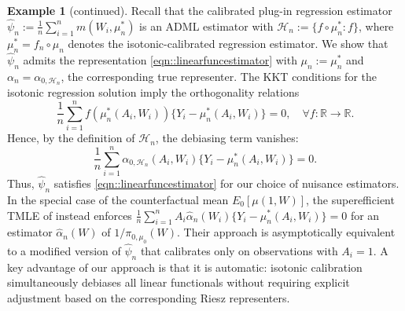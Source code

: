 \documentclass[11pt]{article}
\theoremstyle{definition}
\newtheorem{example}{Example}
\begin{document}
\begin{example}[continued]
Recall that the calibrated plug-in regression estimator \(\widehat{\psi}_n := \frac{1}{n} \sum_{i=1}^n m(W_i,\mu_n^*)\) is an ADML estimator with \(\mathcal{H}_n := \{f \circ \mu_n^* : f\}\), where \(\mu_n^* = f_n \circ \mu_n\) denotes the isotonic-calibrated regression estimator. We show that \(\widehat{\psi}_n\) admits the representation \eqref{eqn::linearfuncestimator} with $\mu_n := \mu_n^*$ and \(\alpha_n = \alpha_{0,\mathcal{H}_n}\), the corresponding true representer. The KKT conditions for the isotonic regression solution imply the orthogonality relations \citep{van2024automatic}
\begin{equation*}
\frac{1}{n} \sum_{i=1}^n f(\mu_n^*(A_i,W_i))\{Y_i - \mu_n^*(A_i,W_i)\} = 0, \quad \forall f:\mathbb{R}\to\mathbb{R}.
\end{equation*}
Hence, by the definition of \(\mathcal{H}_n\), the debiasing term vanishes:
\[
\frac{1}{n}\sum_{i=1}^n \alpha_{0,\mathcal{H}_n}(A_i,W_i)\{Y_i - \mu_n^*(A_i,W_i)\} = 0.
\]
Thus, \(\widehat{\psi}_n\) satisfies \eqref{eqn::linearfuncestimator} for our choice of nuisance estimators. In the special case of the counterfactual mean \(E_0[\mu(1,W)]\), the superefficient TMLE of \citet{ATEsupereff} instead enforces $\frac{1}{n}\sum_{i=1}^n A_i \widehat{\alpha}_n(W_i)\{Y_i - \mu_n^*(A_i,W_i)\} = 0 $ for an estimator \(\widehat{\alpha}_n(W)\) of $1/\pi_{0,\mu_0}(W)$. Their approach is asymptotically equivalent to a modified version of \(\widehat{\psi}_n\) that calibrates only on observations with \(A_i=1\). A key advantage of our approach is that it is automatic: isotonic calibration simultaneously debiases all linear functionals without requiring explicit adjustment based on the corresponding Riesz representers.
 
\end{example}



 
  
\end{document}
